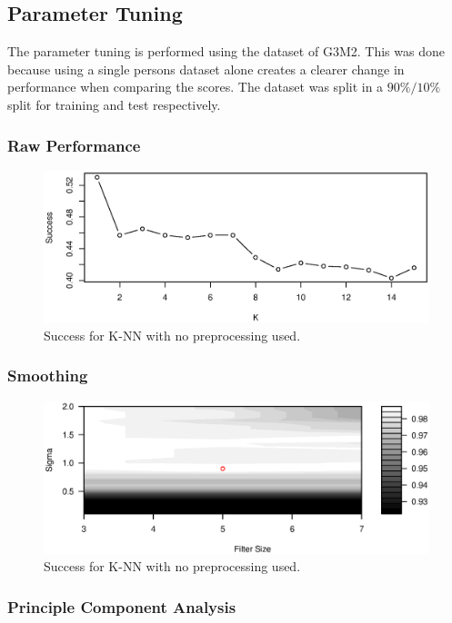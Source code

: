 \subsection{Parameter Tuning}
The parameter tuning is performed using the dataset of G3M2.
This was done because using a single persons dataset alone creates a clearer change in performance when comparing the scores.
The dataset was split in a $90\%/10\%$ split for training and test respectively.


\subsubsection{Raw Performance}

\begin{figure}[H]
\centering
\includegraphics[width = 1 \textwidth]{graphics/knn_raw_success}
\caption{Success for K-NN with no preprocessing used.}
\end{figure}


\subsubsection{Smoothing}

\begin{figure}[H]
\centering
\includegraphics[width = 1 \textwidth]{graphics/knn_smooth_cont}
\caption{Success for K-NN with no preprocessing used.}
\end{figure}


\subsubsection{Principle Component Analysis}

